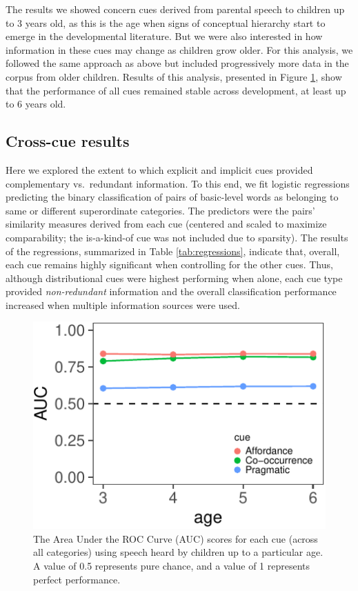 \documentclass[english,,man,floatsintext]{apa6}
\begin{document}
The results we showed concern cues derived from parental speech to children up to 3
years old, as this is the age when signs of conceptual hierarchy start
to emerge in the developmental literature. But we were also interested
in how information in these cues may change as children grow older.
For this analysis, we followed the same approach as above but included progressively more data in the corpus from older children. Results of this analysis, presented in Figure \ref{fig:dev}, show that the performance of all cues remained stable across development, at least up to 6 years old.

\hypertarget{cross-cue-results}{%
\subsection{Cross-cue results}\label{cross-cue-results}}

Here we explored the extent to which explicit and implicit cues provided
complementary vs.~redundant information. To this end, we fit logistic
regressions predicting the binary classification of pairs of basic-level
words as belonging to same or different superordinate categories. The
predictors were the pairs' similarity measures derived from each cue (centered and scaled to maximize comparability; the is-a-kind-of cue was not included due to sparsity). The results of the regressions,
summarized in Table \ref{tab:regressions}, indicate that, overall, each cue remains highly significant when controlling for the other cues. Thus, although distributional cues were highest performing when alone, each cue type provided \emph{non-redundant} information and the overall classification performance increased when multiple information sources were used.

\begin{figure}[h]

{\centering \includegraphics{cogsci_journal_files/figure-latex/dev-1} 

}

\caption{\label{fig:dev} The Area Under the ROC Curve (AUC) scores for each cue (across all categories) using speech heard by children up to a particular age. A value of 0.5 represents pure chance, and a value of 1 represents perfect performance.}\label{fig:dev}
\end{figure}
\end{document}
